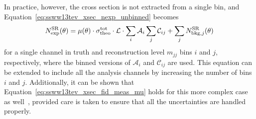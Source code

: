 In practice, however, the cross section is not extracted from a single bin, and Equation~\ref{eq:ssww13tev_xsec_nexp_unbinned} becomes
\begin{equation}
  N_{\textrm{exp}}^{\textrm{SR}}(\theta) = \mu(\theta)\cdot\sigma_{\textrm{theo}}^{\textrm{tot}}\cdot\mathcal{L}\cdot\sum\limits_i\mathcal{A}_i\sum\limits_j\mathcal{C}_{ij}+\sum\limits_j N_{\textrm{bkg},j}^{\textrm{SR}}(\theta)
\end{equation}
for a single channel in truth and reconstruction level $m_{jj}$ bins $i$ and $j$, respectively, where the binned versions of $\mathcal{A}_i$ and $\mathcal{C}_{ij}$ are used.
This equation can be extended to include all the analysis channels by increasing the number of bins $i$ and $j$.
Additionally, it can be shown that Equation~\ref{eq:ssww13tev_xsec_fid_meas_mu} holds for this more complex case as well~\cite{2018.ssww-13tev-atlas-support}, provided care is taken to ensure that all the uncertainties are handled properly.


